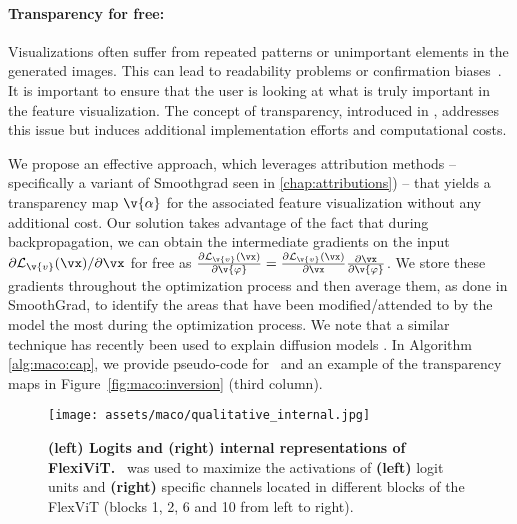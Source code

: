 \paragraph{Transparency for free:}\label{sec:maco:transparency}
Visualizations often suffer from repeated patterns or unimportant elements in the generated images. This can lead to readability problems or confirmation biases~\cite{borowski2020exemplary}. It is important to ensure that the user is looking at what is truly important in the feature visualization. The concept of transparency, introduced in \cite{mordvintsev2018differentiable}, addresses this issue but induces additional implementation efforts and computational costs.

We propose an effective approach, which leverages attribution methods -- specifically a variant of Smoothgrad seen in \autoref{chap:attributions}) -- that yields a transparency map $\v{\alpha}$ for the associated feature visualization without any additional cost. Our solution takes advantage of the fact that during backpropagation, we can obtain the intermediate gradients on the input $\partial \mathcal{L}_{\v{v}}( \vx) / \partial \vx$ for free as $\frac{\partial \mathcal{L}_{\v{v}}( \vx)}{\partial \v{\varphi}} =  \frac{\partial \mathcal{L}_{\v{v}}( \vx)}{\partial \vx} \frac{\partial \vx}{\partial \v{\varphi}}$. We store these gradients throughout the optimization process and then average them, as done in SmoothGrad, to identify the areas that have been modified/attended to by the model the most during the optimization process. We note that a similar technique has recently been used to explain diffusion models \cite{boutin2023diffusion}. In Algorithm \ref{alg:maco:cap}, we provide pseudo-code for \magfv~and an example of the transparency maps in Figure~\ref{fig:maco:inversion} (third column).




\begin{figure}
    \centering
    \texttt{[image: assets/maco/qualitative\_internal.jpg]}
    \caption{\textbf{(left) Logits and (right) internal representations of FlexiViT.}  \magfv~was used to maximize the activations of \textbf{(left)} logit units and \textbf{(right)} specific channels located in different blocks of the FlexViT (blocks 1, 2, 6 and 10 from left to right).}
    \label{fig:maco:logits_and_internal}
\end{figure}





